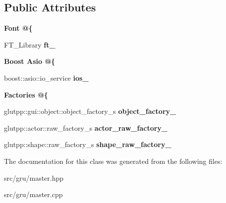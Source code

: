 \subsection*{\-Public \-Attributes}
\begin{Indent}{\bf \-Font @\{}\par
\begin{DoxyCompactItemize}
\item 
\hypertarget{classglutpp_1_1master_a592c6c858ab83ef126cd00ad2369dea2}{\-F\-T\-\_\-\-Library {\bfseries ft\-\_\-}}\label{classglutpp_1_1master_a592c6c858ab83ef126cd00ad2369dea2}

\end{DoxyCompactItemize}
\end{Indent}
\begin{Indent}{\bf \-Boost \-Asio @\{}\par
\begin{DoxyCompactItemize}
\item 
\hypertarget{classglutpp_1_1master_a35e69672b100fd82e9ff538ef120a85a}{boost\-::asio\-::io\-\_\-service {\bfseries ios\-\_\-}}\label{classglutpp_1_1master_a35e69672b100fd82e9ff538ef120a85a}

\end{DoxyCompactItemize}
\end{Indent}
\begin{Indent}{\bf \-Factories @\{}\par
\begin{DoxyCompactItemize}
\item 
\hypertarget{classglutpp_1_1master_a2d4c1404d4ce9241304b4de5040f9ebe}{glutpp\-::gui\-::object\-::object\-\_\-factory\-\_\-s {\bfseries object\-\_\-factory\-\_\-}}\label{classglutpp_1_1master_a2d4c1404d4ce9241304b4de5040f9ebe}

\item 
\hypertarget{classglutpp_1_1master_a63f4ef4068e6e045d79d943a50233a61}{glutpp\-::actor\-::raw\-\_\-factory\-\_\-s {\bfseries actor\-\_\-raw\-\_\-factory\-\_\-}}\label{classglutpp_1_1master_a63f4ef4068e6e045d79d943a50233a61}

\item 
\hypertarget{classglutpp_1_1master_aae46f8577d3f033018d8b3acdadec4f2}{glutpp\-::shape\-::raw\-\_\-factory\-\_\-s {\bfseries shape\-\_\-raw\-\_\-factory\-\_\-}}\label{classglutpp_1_1master_aae46f8577d3f033018d8b3acdadec4f2}

\end{DoxyCompactItemize}
\end{Indent}


\-The documentation for this class was generated from the following files\-:\begin{DoxyCompactItemize}
\item 
src/gru/master.\-hpp\item 
src/gru/master.\-cpp\end{DoxyCompactItemize}

